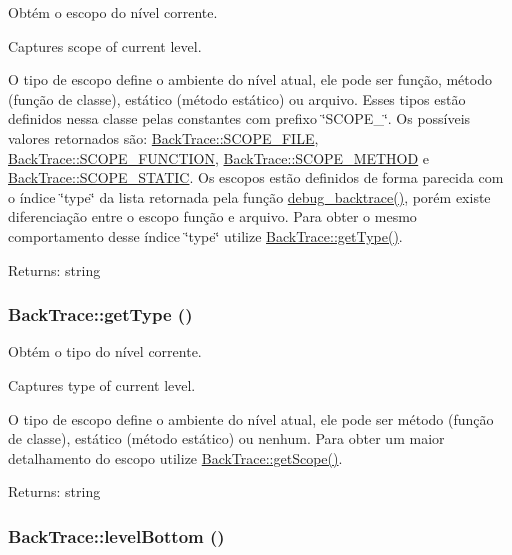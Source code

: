 Obtém o escopo do nível corrente.

Captures scope of current level.

O tipo de escopo define o ambiente do nível atual, ele pode ser função, método (função de classe), estático (método estático) ou arquivo. Esses tipos estão definidos nessa classe pelas constantes com prefixo \char`\"{}SCOPE\_\-\char`\"{}. Os possíveis valores retornados são: \hyperlink{class_back_trace_9efefb3ed5ea7ee8e131f2d8a769fea5}{BackTrace::SCOPE\_\-FILE}, \hyperlink{class_back_trace_ae456bc0b86081f2f7910c0772803224}{BackTrace::SCOPE\_\-FUNCTION}, \hyperlink{class_back_trace_20828cf0730b25b234bd8b63614988f5}{BackTrace::SCOPE\_\-METHOD} e \hyperlink{class_back_trace_39bb2bf7f6eedb012f02ca7a78218f4d}{BackTrace::SCOPE\_\-STATIC}. Os escopos estão definidos de forma parecida com o índice \char`\"{}type\char`\"{} da lista retornada pela função \hyperlink{}{debug\_\-backtrace()}, porém existe diferenciação entre o escopo função e arquivo. Para obter o mesmo comportamento desse índice \char`\"{}type\char`\"{} utilize \hyperlink{class_back_trace_bd89e82b5c431300ccc0180a4cc198c8}{BackTrace::getType()}.

\begin{Desc}
\item[Returns:]string \end{Desc}
\hypertarget{class_back_trace_bd89e82b5c431300ccc0180a4cc198c8}{
\subsubsection[{getType}]{\setlength{\rightskip}{0pt plus 5cm}BackTrace::getType ()}}
\label{class_back_trace_bd89e82b5c431300ccc0180a4cc198c8}


Obtém o tipo do nível corrente.

Captures type of current level.

O tipo de escopo define o ambiente do nível atual, ele pode ser método (função de classe), estático (método estático) ou nenhum. Para obter um maior detalhamento do escopo utilize \hyperlink{class_back_trace_3b1b222bfb41081888742dadf70e2dfb}{BackTrace::getScope()}.

\begin{Desc}
\item[Returns:]string \end{Desc}
\hypertarget{class_back_trace_6255f13465b4c5c5824e646863945cbf}{
\subsubsection[{levelBottom}]{\setlength{\rightskip}{0pt plus 5cm}BackTrace::levelBottom ()}}
\label{class_back_trace_6255f13465b4c5c5824e646863945cbf}


